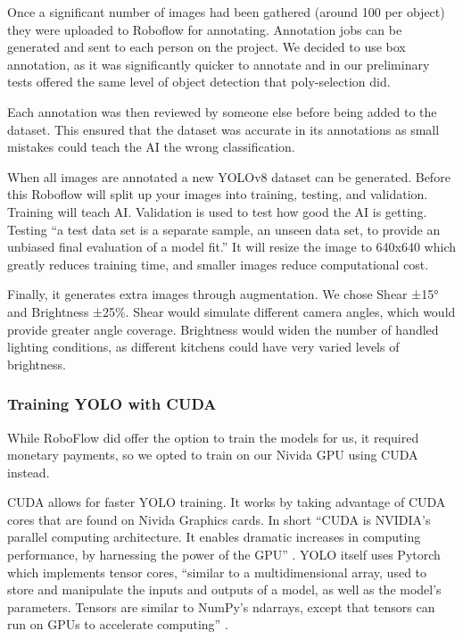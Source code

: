 \documentclass{article}
\begin{document}
Once a significant number of images had been gathered (around 100 per object)
they were uploaded to Roboflow for annotating. Annotation jobs can be generated
and sent to each person on the project. We decided to use box annotation, as it
was significantly quicker to annotate and in our preliminary tests offered the
same level of object detection that poly-selection did.

Each annotation was then reviewed by someone else before being added to the
dataset. This ensured that the dataset was accurate in its annotations as small
mistakes could teach the AI the wrong classification.

When all images are annotated a new YOLOv8 dataset can be generated. Before
this Roboflow will split up your images into training, testing, and validation.
Training will teach AI. Validation is used to test how good the AI is getting.
Testing “a test data set is a separate sample, an unseen data set, to provide
an unbiased final evaluation of a model fit.” \cite{trainvalidtest} It will
resize the image to 640x640 which greatly reduces training time, and smaller
images reduce computational cost.

Finally, it generates extra images through augmentation. We chose Shear ±15°
and Brightness ±25\%. Shear would simulate different camera angles, which would
provide greater angle coverage. Brightness would widen the number of handled
lighting conditions, as different kitchens could have very varied levels of
brightness.

\subsubsection{Training YOLO with CUDA}
While RoboFlow did offer the option to train the models for us, it required
monetary payments, so we opted to train on our Nivida GPU using CUDA
\cite{cudacuda} instead.

CUDA allows for faster YOLO training. It works by taking advantage of CUDA
cores that are found on Nivida Graphics cards. In short “CUDA is NVIDIA’s
parallel computing architecture. It enables dramatic increases in computing
performance, by harnessing the power of the GPU” \cite{ghorpade2012gpgpu}. YOLO
itself uses Pytorch \cite{nvidiapytorch} which implements tensor cores,
“similar to a multidimensional array, used to store and manipulate the inputs
and outputs of a model, as well as the model’s parameters. Tensors are similar
to NumPy’s ndarrays, except that tensors can run on GPUs to accelerate
computing” \cite{nvidiapytorch}.
\end{document}
